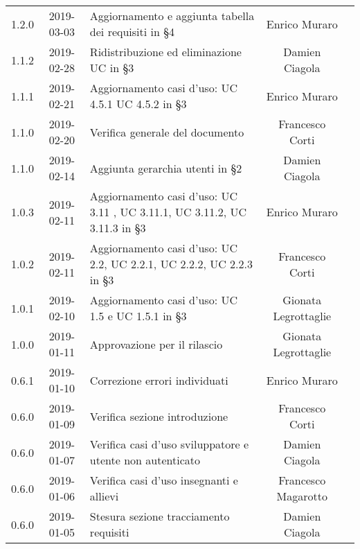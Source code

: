 {\begin{longtable}{ c c C{6cm} c c }
		
		1.2.0 &
		2019-03-03 &
		Aggiornamento e aggiunta tabella dei requisiti in §4 &
		Enrico Muraro&
		\reda{} \\
		
		1.1.2 &
		2019-02-28 &
		Ridistribuzione ed eliminazione UC in §3 &
		Damien Ciagola&
		\reda{} \\	
		
		
		1.1.1 &
		2019-02-21 &
		Aggiornamento casi d'uso: UC 4.5.1 UC 4.5.2 in §3 &
		Enrico Muraro&
		\reda{} \\		
				
		1.1.0 &
		2019-02-20 &
		Verifica generale del documento&
		Francesco Corti&
		\reda{} \\		
				
		1.1.0 &
		2019-02-14 &
		Aggiunta gerarchia utenti in §2 &
		Damien Ciagola&
		\reda{} \\
		
		1.0.3 &
		2019-02-11 &
		Aggiornamento casi d'uso: UC 3.11 , UC 3.11.1, UC 3.11.2, UC 3.11.3 in §3 &
		Enrico Muraro&
		\reda{} \\
		
		1.0.2 &
		2019-02-11 &
		Aggiornamento casi d'uso: UC 2.2, UC 2.2.1, UC 2.2.2, UC 2.2.3 in §3 &
		Francesco Corti&
		\reda{} \\

		1.0.1 &
		2019-02-10 &
		Aggiornamento casi d'uso: UC 1.5 e UC 1.5.1 in §3 &
		Gionata Legrottaglie&
		\reda{} \\

		1.0.0 &
		2019-01-11 &
		Approvazione per il rilascio &	
		Gionata Legrottaglie&	
		\Res{} \\
		
		0.6.1 & 
		2019-01-10 &  
		Correzione errori individuati &	
		Enrico Muraro&	
		\reda{} \\
		
		0.6.0 & 
		2019-01-09 &  
		Verifica sezione introduzione &	
		Francesco Corti&	
		\ver{} \\
		
		0.6.0 & 
		2019-01-07 &  
		Verifica casi d'uso sviluppatore e utente non autenticato& 	
		Damien Ciagola  &	
		\ver{} \\
		
		0.6.0 & 
		2019-01-06 &  
		Verifica casi d'uso insegnanti e allievi & 
		Francesco Magarotto  &
		\ver{}  \\
		
		0.6.0 & 
		2019-01-05 &  
		Stesura sezione tracciamento requisiti &	
		Damien Ciagola &	
		\reda{} \\
		

\end{longtable}}
